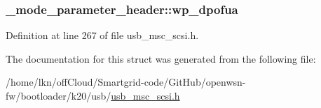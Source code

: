 \subsubsection[{\texorpdfstring{wp\+\_\+dpofua}{wp_dpofua}}]{ \+\_\+mode\+\_\+parameter\+\_\+header\+::wp\+\_\+dpofua}\hypertarget{struct__mode__parameter__header_a2396a990a4a179272e4f8d2aec4a9221}{}\label{struct__mode__parameter__header_a2396a990a4a179272e4f8d2aec4a9221}


Definition at line 267 of file usb\+\_\+msc\+\_\+scsi.\+h.



The documentation for this struct was generated from the following file\+:\begin{DoxyCompactItemize}
\item 
/home/lkn/off\+Cloud/\+Smartgrid-\/code/\+Git\+Hub/openwsn-\/fw/bootloader/k20/usb/\hyperlink{usb__msc__scsi_8h}{usb\+\_\+msc\+\_\+scsi.\+h}\end{DoxyCompactItemize}
